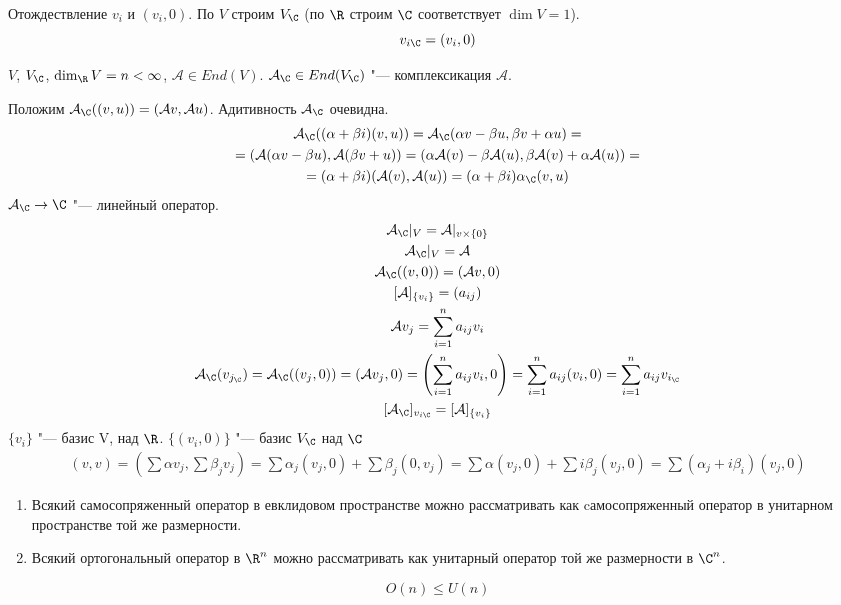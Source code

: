 Отождествление $v_i$ и $(v_i, 0)$.
По $V$ строим $V_{\C}$ (по $\R$ строим $\C$ соответствует $\dim V = 1$).
\[ v_{i\C} = (v_i,0) \]
\begin{Def}
	$V$, $V_{\C}$, $\dim_{\R}V = n < \infty$, $\mathcal A \in End(V)$.
	$\mathcal A_{\C} \in End(V_{\C})$ "--- комплексикация $\mathcal A$.
\end{Def}
Положим $\mathcal A_{\C} ((v, u)) = (\mathcal Av, \mathcal Au)$.
Адитивность $\mathcal A_{\C}$ очевидна.
\begin{gather*}
	\mathcal A_{\C}((\alpha + \beta i)(v, u))
	= \mathcal A_{\C}(\alpha v - \beta u, \beta v + \alpha u) = \\
	= (\mathcal A(\alpha v - \beta u), \mathcal A(\beta v + u))
	= (\alpha \mathcal A(v) - \beta \mathcal A(u), \beta \mathcal A(v) + \alpha \mathcal A(u)) = \\
	= (\alpha + \beta i)(\mathcal A(v), \mathcal A(u)) = (\alpha + \beta i)\alpha_{\C}(v, u)
\end{gather*}
$\mathcal A_{\C} \to \C$ "--- линейный оператор.
\begin{gather*}
	\mathcal A_{\C}|_{V} = \mathcal A|_{v \times \{0\}} \\
	\mathcal A_{\C}|_{V} = \mathcal A \\
	\mathcal A_{\C}((v, 0)) = (\mathcal Av, 0) \\
	[\mathcal A]_{\{v_i\}} = (a_{ij}) \\
	\mathcal A v_j = \sum_{i = 1}^n a_{ij}v_i \\
	\mathcal A_{\C}(v_{j_{\C}})
	= \mathcal A_{\C}((v_j, 0))
	= (\mathcal Av_j, 0)
	= \left(\sum_{i = 1}^{n}a_{ij}v_i, 0\right)
	= \sum_{i = 1}^{n}a_{ij}(v_i, 0)
	= \sum_{i = 1}^{n}a_{ij}v_{i_{\C}} \\
	[\mathcal A_{\C}]_{v_{i\C}} = [\mathcal A]_{\{v_i\}}
\end{gather*}
$\{v_i\}$ "--- базис V, над $\R$.
$\{(v_i, 0)\}$ "--- базис $V_{\C}$ над $\C$
\begin{gather*}
	(v, v)
	= \left(\sum \alpha v_j, \sum \beta_{j}v_j\right)
	= \sum \alpha_j(v_j, 0) + \sum \beta_j(0, v_j)
	= \sum \alpha(v_j, 0) + \sum i \beta_j(v_j, 0)
	= \sum(\alpha_j + i \beta_i)(v_j, 0)
\end{gather*}

\begin{exmp}
	\begin{enumerate}
	\item
		Всякий самосопряженный оператор в евклидовом пространстве можно рассматривать как
		cамосопряженный оператор в унитарном пространстве той же размерности.
	\item
		Всякий ортогональный оператор в $\R^n$ можно рассматривать как унитарный оператор той же размерности в $\C^n$.
	\end{enumerate}
\end{exmp}
\begin{conseq}
   \[ O(n) \le U(n) \]
\end{conseq}

